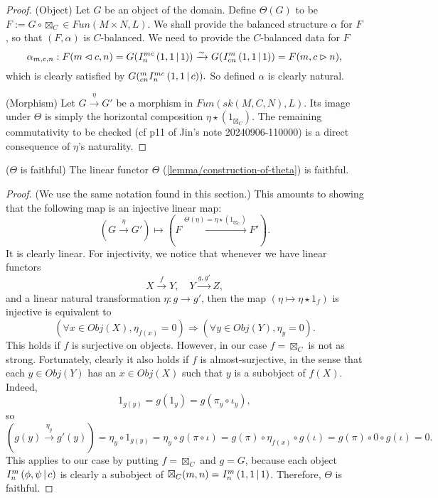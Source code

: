 \begin{proof}
  \noindent (Object) Let $G$ be an object of the domain. Define $\Theta(G)$ to
  be $F := G \circ \boxtimes_{C} \in Fun(M \times N, L)$. We shall provide the
  balanced structure $\alpha$ for $F$, so that $(F, \alpha)$ is $C$-balanced. 
  We need to provide the $C$-balanced data for $F$
  \[
    \alpha_{m,c,n}: F(m \lhd c, n) = G({}^{}_{} I^{mc}_{n} \left( 1, 1 \,\middle|\, 1 \right)) \xrightarrow{\sim} G({}^{}_{} I^{m}_{cn} \left( 1, 1 \,\middle|\, 1 \right)) = F(m, c \rhd n),
  \]
  which is clearly satisfied by $G({}^{m}_{cn} I^{mc}_{n} \left( 1, 1 \,\middle|\, c \right)).$ So defined $\alpha$ is clearly natural.

  \noindent (Morphism) Let $G \xrightarrow{\eta} G'$ be a morphism in
  $Fun(sk(M,C,N), L)$. Its image under $\Theta$ is simply the horizontal
  composition $\eta \star (1_{\boxtimes_{C}})$. The remaining commutativity to
  be checked (cf p11 of Jin's note 20240906-110000) is a direct consequence of
  $\eta$'s naturality.
\end{proof}

\begin{lemma}\label{lemma/theta-is-faithful} ($\Theta$ is faithful) The linear
  functor $\Theta$ (\ref{lemma/construction-of-theta}) is faithful.
\end{lemma}

\begin{proof}
  (We use the same notation found in this section.) This amounts to showing
  that the following map is an injective linear map:
  \[
    (G \xrightarrow{\eta} G') \mapsto (F \xrightarrow{\Theta(\eta) = \eta \star (1_{\boxtimes_{C}})} F').
  \]
  It is clearly linear. For injectivity, we notice that whenever we have
  linear functors
  \[
    X \xrightarrow{f} Y,\quad Y \xrightarrow{g, g'} Z,
  \]
  and a linear natural transformation $\eta: g \to g'$, then the map $(\eta \mapsto \eta \star 1_{f})$ is injective is equivalent to
  \[
    (\forall x \in Obj(X), \eta_{f(x)} = 0) \Rightarrow (\forall y \in Obj(Y), \eta_{y} = 0).
  \]
  This holds if $f$ is surjective on objects. However, in our case
  $f = \boxtimes_{C}$ is not as strong. Fortunately, clearly it also holds if
  $f$ is almost-surjective, in the sense that each $y \in Obj(Y)$ has an
  $x \in Obj(X)$ such that $y$ is a subobject of $f(X)$. Indeed,
  \[
    1_{g(y)} = g(1_{y}) = g(\pi_{y} \circ \iota_{y}),
  \]
  so
  \[
    (g(y) \xrightarrow{\eta_{y}} g'(y)) = \eta_{y} \circ 1_{g(y)} = \eta_{y} \circ g(\pi \circ \iota) = g(\pi) \circ \eta_{f(x)} \circ g(\iota) = g(\pi) \circ 0 \circ g(\iota) = 0.
  \]
  This applies to our case by putting $f = \boxtimes_{C}$ and $g = G$, because
  each object ${}^{}_{} I^{m}_{n} \left( \phi, \psi \,\middle|\, c \right)$ is clearly a subobject of
  $\boxtimes_{C}(m,n) = {}^{}_{} I^{m}_{n} \left( 1, 1 \,\middle|\, 1 \right)$. Therefore, $\Theta$ is faithful.
\end{proof}

